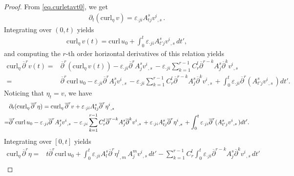\documentclass[12pt,twoside,reqno]{amsart}
\numberwithin{equation}{section}
\theoremstyle{definition}
\theoremstyle{remark}
\begin{document}
\begin{proof}
From \eqref{eq.curletavt0}, we get
\begin{align*}
  {\partial}_t({\mathrm{curl}_\eta\,} v)={\varepsilon}_{\cdot ji}A_{tj}^s {{{v^i}}_{,{s}}\,}.
\end{align*}
Integrating over $(0,t)$ yields
\begin{align}\label{eq.curl}
  {\mathrm{curl}_\eta\,} v(t)={\mathrm{curl}\,} u_0+\int_0^t {\varepsilon}_{\cdot ji} A_{t'j}^s{{{v^i}}_{,{s}}\,}dt',
\end{align}
and computing the $r$-th order horizontal derivatives of this relation yields
\begin{align*}
  {\mathrm{curl}_\eta\,} {\overline{\partial}}^r v(t)=&{\overline{\partial}}^r({\mathrm{curl}_\eta\,} v(t))-{\varepsilon}_{\cdot ji} {\overline{\partial}}^r A_j^s {{{v^i}}_{,{s}}\,}-{\varepsilon}_{\cdot ji}\sum_{k=1}^{r-1}C_r^l{\overline{\partial}}^{r-k}A^s_j{\overline{\partial}}^k {{{v^i}}_{,{s}}\,}\\
  =&{\overline{\partial}}^r{\mathrm{curl}\,} u_0-{\varepsilon}_{\cdot ji} {\overline{\partial}}^r  A_j^s {{{v^i}}_{,{s}}\,}-{\varepsilon}_{\cdot ji}\sum_{k=1}^{r-1}C_r^l{\overline{\partial}}^{r-k}A^s_j{\overline{\partial}}^k {{{v^i}}_{,{s}}\,}+\int_0^t {\varepsilon}_{\cdot ji} {\overline{\partial}}^r (A_{t'j}^s{{{v^i}}_{,{s}}\,})dt'.
\end{align*}
Noticing that $\eta_t=v$, we have
\begin{align}
&{\partial}_t({\mathrm{curl}_\eta\,} {\overline{\partial}}^r \eta)={\mathrm{curl}_\eta\,} {\overline{\partial}}^r  v+{\varepsilon}_{\cdot ji}A_{tj}^s{\overline{\partial}}^r  {{{\eta^i}}_{,{s}}\,}{\nonumber}\\
  =&{\overline{\partial}}^r{\mathrm{curl}\,} u_0-{\varepsilon}_{\cdot ji} {\overline{\partial}}^r  A_j^s {{{v^i}}_{,{s}}\,}-{\varepsilon}_{\cdot ji}\sum_{k=1}^{r-1}C_r^l{\overline{\partial}}^{r-k}A^s_j{\overline{\partial}}^k {{{v^i}}_{,{s}}\,}+{\varepsilon}_{\cdot ji}A_{tj}^s{\overline{\partial}}^r  {{{\eta^i}}_{,{s}}\,}+\int_0^t {\varepsilon}_{\cdot ji} {\overline{\partial}}^r (A_{t'j}^s{{{v^i}}_{,{s}}\,})dt'.
\end{align}
Integrating over $[0,t]$ yields
\begin{align*}
  {\mathrm{curl}_\eta\,} {\overline{\partial}}^r \eta
  =&t{\overline{\partial}}^r{\mathrm{curl}\,} u_0+\int_0^t{\varepsilon}_{\cdot ji} A_l^s{\overline{\partial}}^r  {{{\eta^l}}_{,{m}}\,}A^m_j {{{v^i}}_{,{s}}\,}dt'-\sum_{k=1}^{r-1}C_r^l\int_0^t {\varepsilon}_{\cdot ji}{\overline{\partial}}^{r-k}A^s_j{\overline{\partial}}^k {{{v^i}}_{,{s}}\,}dt'\\

\end{align*}
\end{proof}
\end{document}
